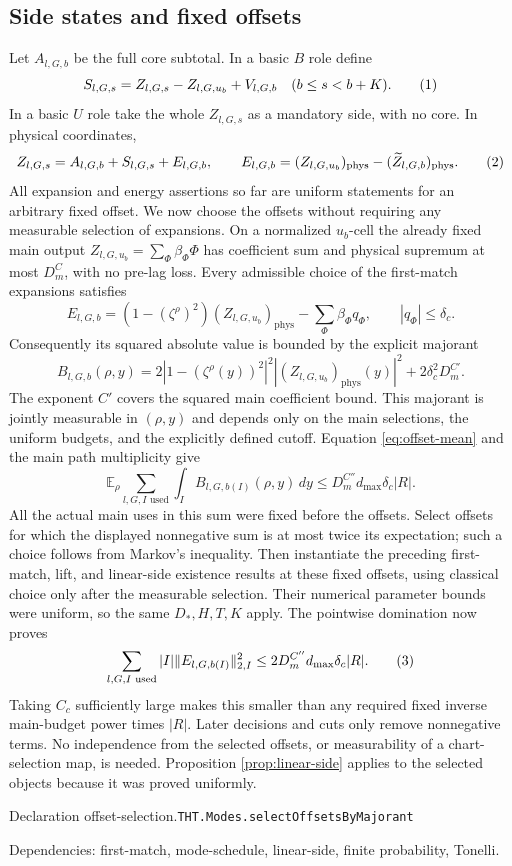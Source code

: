 \documentclass[11pt]{article}
\theoremstyle{definition}
\newcommand{\E}{\mathbb E}
\newcommand{\phys}{\mathrm{phys}}
\newcommand{\eqtag}[1]{\refstepcounter{equation}\tag{\theequation}\label{#1}}
\numberwithin{equation}{section}
\newcommand{\bp}[3]{\par\smallskip\begingroup\footnotesize
\noindent\hypertarget{bp:#1}{\textsf{Declaration #1.}}\quad\nolinkurl{#2}\par
\noindent\textsf{Dependencies:} #3.\par\endgroup\smallskip}
\begin{document}
\subsection{Side states and fixed offsets}
Let $A_{l,G,b}$ be the full core subtotal. In a basic $B$ role define
\[
 S_{l,G,s}=Z_{l,G,s}-Z_{l,G,u_b}+V_{l,G,b}\quad(b\le s<b+K).
 \eqtag{eq:sides}
\]
In a basic $U$ role take the whole $Z_{l,G,s}$ as a mandatory side, with no core. In physical coordinates,
\[
 Z_{l,G,s}=A_{l,G,b}+S_{l,G,s}+E_{l,G,b},
 \qquad E_{l,G,b}=(Z_{l,G,u_b})_{\phys}-(\widetilde Z_{l,G,b})_{\phys}.
 \eqtag{eq:core-side-error}
\]
All expansion and energy assertions so far are uniform statements for an arbitrary fixed offset. We now choose the offsets without requiring any measurable selection of expansions. On a normalized $u_b$-cell the already fixed main output $Z_{l,G,u_b}=\sum_\Phi\beta_\Phi\Phi$ has coefficient sum and physical supremum at most $D_m^C$, with no pre-lag loss. Every admissible choice of the first-match expansions satisfies
\[
 E_{l,G,b}=(1-(\zeta^\rho)^2)(Z_{l,G,u_b})_{\phys}-\sum_\Phi\beta_\Phi q_\Phi,
 \qquad |q_\Phi|\le\delta_c.
\]
Consequently its squared absolute value is bounded by the explicit majorant
\[
 B_{l,G,b}(\rho,y)=2|1-(\zeta^\rho(y))^2|^2|(Z_{l,G,u_b})_{\phys}(y)|^2
 +2\delta_c^2D_m^{C'}.
\]
The exponent $C'$ covers the squared main coefficient bound. This majorant is jointly measurable in $(\rho,y)$ and depends only on the main selections, the uniform budgets, and the explicitly defined cutoff. Equation \eqref{eq:offset-mean} and the main path multiplicity give
\[
 \E_\rho\sum_{l,G,I\text{ used}}\int_I B_{l,G,b(I)}(\rho,y)\,dy
 \le D_m^{C''}d_{\max}\delta_c|R|.
\]
All the actual main uses in this sum were fixed before the offsets. Select offsets for which the displayed nonnegative sum is at most twice its expectation; such a choice follows from Markov's inequality. Then instantiate the preceding first-match, lift, and linear-side existence results at these fixed offsets, using classical choice only after the measurable selection. Their numerical parameter bounds were uniform, so the same $D_*,H,T,K$ apply. The pointwise domination now proves
\[
 \sum_{l,G,I\text{ used}}|I|\|E_{l,G,b(I)}\|_{2,I}^2
 \le 2D_m^{C''}d_{\max}\delta_c|R|.
 \eqtag{eq:physical-error}
\]
Taking $C_c$ sufficiently large makes this smaller than any required fixed inverse main-budget power times $|R|$. Later decisions and cuts only remove nonnegative terms. No independence from the selected offsets, or measurability of a chart-selection map, is needed. Proposition \ref{prop:linear-side} applies to the selected objects because it was proved uniformly.
\bp{offset-selection}{THT.Modes.selectOffsetsByMajorant}{first-match, mode-schedule, linear-side, finite probability, Tonelli}
\end{document}
